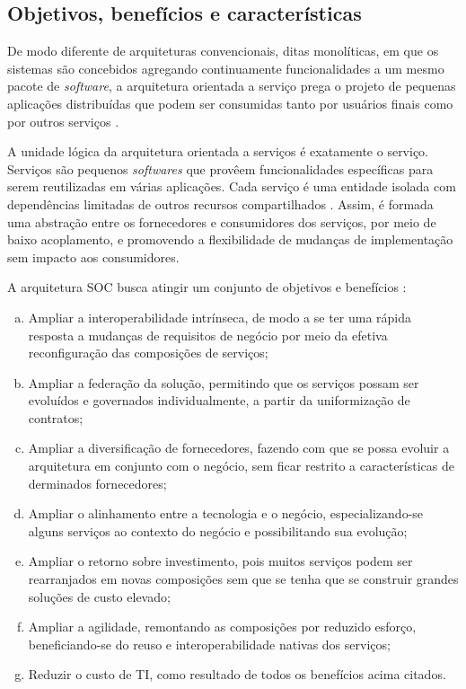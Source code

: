 \subsection{Objetivos, benefícios e características}
\vspace{-6mm}

De modo diferente de arquiteturas convencionais, ditas monolíticas, em que os
sistemas são concebidos agregando continuamente funcionalidades a um mesmo pacote de
\textit{software}, a arquitetura orientada a serviço prega o projeto de pequenas
aplicações distribuídas que podem ser consumidas tanto por usuários finais como
por outros serviços \cite{papazoglou2007serviceApprTechRechIss}. 

A unidade lógica da arquitetura orientada a serviços é exatamente o serviço.
Serviços são pequenos \textit{softwares} que provêem funcionalidades específicas
para serem reutilizadas em várias aplicações. Cada serviço é uma entidade isolada com
dependências limitadas de outros recursos compartilhados
\cite{serrano2014service}. Assim, é formada uma abstração entre os fornecedores
e consumidores dos serviços, por meio de baixo acoplamento, e promovendo a
flexibilidade de mudanças de implementação sem impacto aos consumidores.

A arquitetura SOC busca atingir um conjunto de objetivos e benefícios
\cite{erl2008soaDesigPatterns}:
\begin{enumerate}[(a)] 
  \item Ampliar a interoperabilidade intrínseca, de modo a se ter uma rápida
  resposta a mudanças de requisitos de negócio por meio da efetiva
  reconfiguração das composições de serviços;
  \item Ampliar a federação da solução, permitindo que os serviços possam ser
  evoluídos e governados individualmente, a partir da uniformização de
  contratos;
  \item Ampliar a diversificação de fornecedores, fazendo com que se possa
  evoluir a arquitetura em conjunto com o negócio, sem ficar restrito a
  características de derminados fornecedores;
  \item Ampliar o alinhamento entre a tecnologia e o negócio, especializando-se
  alguns serviços ao contexto do negócio e possibilitando sua evolução;
  \item Ampliar o retorno sobre investimento, pois muitos serviços podem
  ser rearranjados em novas composições sem que se tenha que se construir
  grandes soluções de custo elevado;
  \item Ampliar a agilidade, remontando as composições por reduzido esforço,
  beneficiando-se do reuso e interoperabilidade nativas dos serviços;
  \item Reduzir o custo de TI, como resultado de todos os benefícios acima
  citados.
\end{enumerate}

